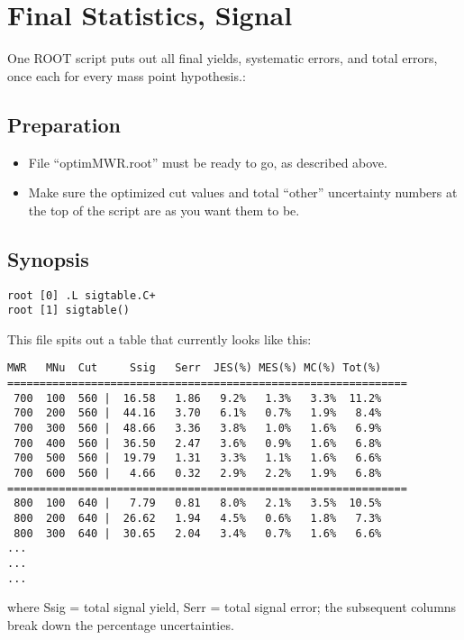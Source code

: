 \documentclass[english]{article}
\begin{document}
\section{Final Statistics, Signal}

One ROOT script puts out all final yields, systematic errors, and total
errors, once each for every mass point hypothesis.:


\subsection{Preparation}

\begin{itemize}
\item File ``optimMWR.root'' must be ready to go, as described above.
\item Make sure the optimized cut values and total ``other'' uncertainty
numbers at the top of the script are as you want them to be.
\end{itemize}

\subsection{Synopsis}
%
\begin{lstlisting}
root [0] .L sigtable.C+
root [1] sigtable()
\end{lstlisting}

This file spits out a table that currently looks like this:
%
\begin{verbatim}
MWR   MNu  Cut     Ssig   Serr  JES(%) MES(%) MC(%) Tot(%)
==============================================================
 700  100  560 |  16.58   1.86   9.2%   1.3%   3.3%  11.2%
 700  200  560 |  44.16   3.70   6.1%   0.7%   1.9%   8.4%
 700  300  560 |  48.66   3.36   3.8%   1.0%   1.6%   6.9%
 700  400  560 |  36.50   2.47   3.6%   0.9%   1.6%   6.8%
 700  500  560 |  19.79   1.31   3.3%   1.1%   1.6%   6.6%
 700  600  560 |   4.66   0.32   2.9%   2.2%   1.9%   6.8%
==============================================================
 800  100  640 |   7.79   0.81   8.0%   2.1%   3.5%  10.5%
 800  200  640 |  26.62   1.94   4.5%   0.6%   1.8%   7.3%
 800  300  640 |  30.65   2.04   3.4%   0.7%   1.6%   6.6%
...
...
...
\end{verbatim}

where Ssig = total signal yield, Serr = total signal error;
the subsequent columns break down the percentage uncertainties.
\end{document}
